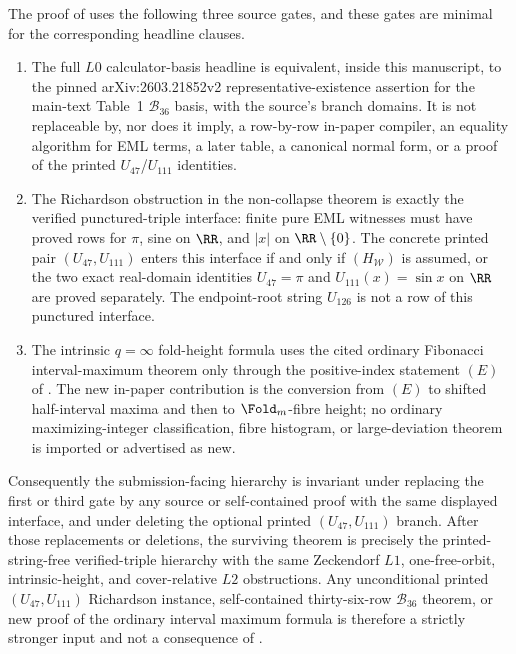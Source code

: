 \begin{theorem}
\label{thm:source-gate-rigidity}
\label{thm:main-chain-external-anchor-rigidity}
\label{thm:submission-source-gate-classification}
\label{thm:minimal-source-gate-classification}
The proof of 
uses the following three source gates, and these gates are minimal for the
corresponding headline clauses.
\begin{enumerate}
\item The full \(L0\) calculator-basis headline is equivalent, inside this
  manuscript, to the pinned arXiv:2603.21852v2 representative-existence assertion
  for the main-text Table~1 \(\mathcal B_{36}\) basis, with the source's branch
  domains.  It is not replaceable by, nor does it imply, a row-by-row in-paper
  compiler, an equality algorithm for EML terms, a later table, a canonical
  normal form, or a proof of the printed \(U_{47}\)/\(U_{111}\) identities.
\item The Richardson obstruction in the non-collapse theorem is exactly the
  verified punctured-triple interface: finite pure EML witnesses must have proved
  rows for \(\pi\), sine on \(\RR\), and \(|x|\) on
  \(\RR\setminus\{0\}\).  The concrete printed pair \((U_{47},U_{111})\) enters
  this interface if and only if \((H_{\mathcal W})\) is assumed, or the two exact
  real-domain identities \(U_{47}=\pi\) and \(U_{111}(x)=\sin x\) on \(\RR\) are
  proved separately.  The endpoint-root string \(U_{126}\) is not a row of this
  punctured interface.
\item The intrinsic \(q=\infty\) fold-height formula uses the cited ordinary
  Fibonacci interval-maximum theorem only through the positive-index statement
  \((E)\) of .  The new in-paper
  contribution is the conversion from \((E)\) to shifted half-interval maxima and
  then to \(\Fold_m\)-fibre height; no ordinary maximizing-integer classification,
  fibre histogram, or large-deviation theorem is imported or advertised as new.
\end{enumerate}
Consequently the submission-facing hierarchy is invariant under replacing the
first or third gate by any source or self-contained proof with the same displayed
interface, and under deleting the optional printed \((U_{47},U_{111})\) branch.
After those replacements or deletions, the surviving theorem is precisely the
printed-string-free verified-triple hierarchy with the same Zeckendorf \(L1\),
one-free-orbit, intrinsic-height, and cover-relative \(L2\) obstructions.  Any
unconditional printed \((U_{47},U_{111})\) Richardson instance, self-contained
thirty-six-row \(\mathcal B_{36}\) theorem, or new proof of the ordinary interval
maximum formula is therefore a strictly stronger input and not a consequence of
.
\end{theorem}

